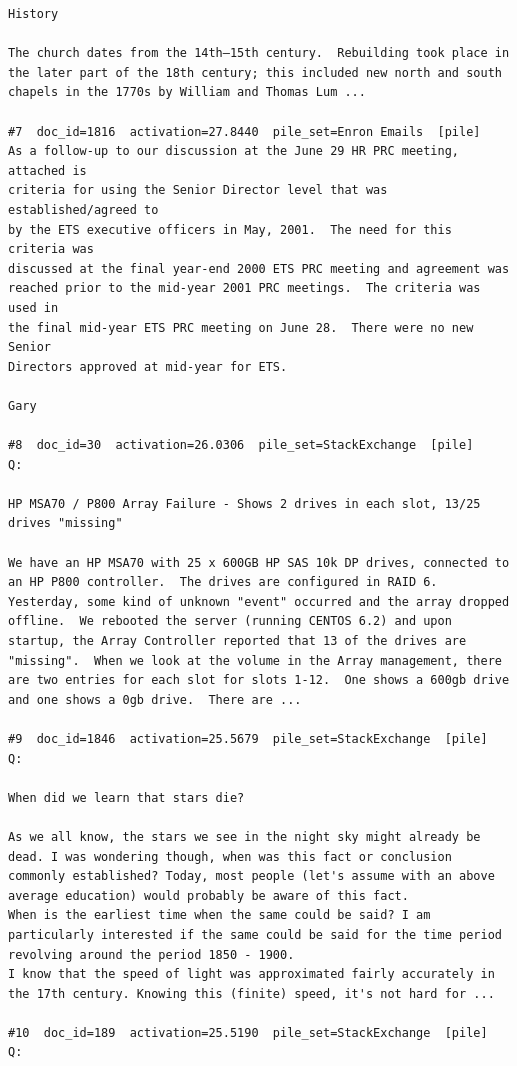 \begin{verbatim}
History

The church dates from the 14th–15th century.  Rebuilding took place in the later part of the 18th century; this included new north and south chapels in the 1770s by William and Thomas Lum ...

#7  doc_id=1816  activation=27.8440  pile_set=Enron Emails  [pile]
As a follow-up to our discussion at the June 29 HR PRC meeting, attached is 
criteria for using the Senior Director level that was established/agreed to 
by the ETS executive officers in May, 2001.  The need for this criteria was 
discussed at the final year-end 2000 ETS PRC meeting and agreement was 
reached prior to the mid-year 2001 PRC meetings.  The criteria was used in 
the final mid-year ETS PRC meeting on June 28.  There were no new Senior 
Directors approved at mid-year for ETS.

Gary

#8  doc_id=30  activation=26.0306  pile_set=StackExchange  [pile]
Q:

HP MSA70 / P800 Array Failure - Shows 2 drives in each slot, 13/25 drives "missing"

We have an HP MSA70 with 25 x 600GB HP SAS 10k DP drives, connected to an HP P800 controller.  The drives are configured in RAID 6.  
Yesterday, some kind of unknown "event" occurred and the array dropped offline.  We rebooted the server (running CENTOS 6.2) and upon startup, the Array Controller reported that 13 of the drives are "missing".  When we look at the volume in the Array management, there are two entries for each slot for slots 1-12.  One shows a 600gb drive and one shows a 0gb drive.  There are ...

#9  doc_id=1846  activation=25.5679  pile_set=StackExchange  [pile]
Q:

When did we learn that stars die?

As we all know, the stars we see in the night sky might already be dead. I was wondering though, when was this fact or conclusion commonly established? Today, most people (let's assume with an above average education) would probably be aware of this fact.
When is the earliest time when the same could be said? I am particularly interested if the same could be said for the time period revolving around the period 1850 - 1900.
I know that the speed of light was approximated fairly accurately in the 17th century. Knowing this (finite) speed, it's not hard for ...

#10  doc_id=189  activation=25.5190  pile_set=StackExchange  [pile]
Q:


\end{verbatim}
